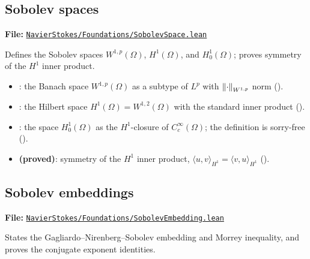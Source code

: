 \subsection{Sobolev spaces}\label{sec:lean-ch1-sobolev}

\textbf{File:}
\href{https://github.com/alejandro-soto-franco/navier-stokes/blob/master/lean/NavierStokes/Foundations/SobolevSpace.lean}%
{\texttt{NavierStokes/Foundations/SobolevSpace.lean}}

\medskip\noindent
Defines the Sobolev spaces $W^{1,p}(\Omega)$, $H^{1}(\Omega)$, and
$H^{1}_{0}(\Omega)$; proves symmetry of the $H^{1}$ inner product.

\begin{itemize}
  \item {}: the Banach space $W^{1,p}(\Omega)$
    as a subtype of $L^{p}$ with $\left\lVert \cdot \right\rVert_{W^{1,p}}$ norm
    ().
  \item {}: the Hilbert space $H^{1}(\Omega) =
    W^{1,2}(\Omega)$ with the standard inner product ().
  \item {}: the space $H^{1}_{0}(\Omega)$
    as the $H^{1}$-closure of $C^{\infty}_{c}(\Omega)$; the definition is
    sorry-free ().
  \item {} \textbf{(proved)}:
    symmetry of the $H^{1}$ inner product,
    $\langle u, v \rangle_{H^{1}} = \langle v, u \rangle_{H^{1}}$
    ().
\end{itemize}

\subsection{Sobolev embeddings}\label{sec:lean-ch1-embedding}

\textbf{File:}
\href{https://github.com/alejandro-soto-franco/navier-stokes/blob/master/lean/NavierStokes/Foundations/SobolevEmbedding.lean}%
{\texttt{NavierStokes/Foundations/SobolevEmbedding.lean}}

\medskip\noindent
States the Gagliardo--Nirenberg--Sobolev embedding and Morrey inequality, and
proves the conjugate exponent identities.

